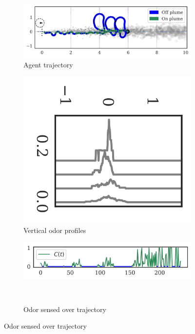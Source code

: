 \documentclass[5p,twocolumn,authoryear]{elsarticle}
\begin{document}
\begin{figure}[h!]
\centering
\begin{subfigure}{0.44\textwidth}
    \includegraphics[width=\textwidth]{output_16_1}
    \caption{Agent trajectory}
\end{subfigure}%
\vspace{0.00mm} 
\begin{subfigure}{0.14\textwidth}
    \includegraphics[width=\textwidth,angle=90,origin=c]{output_16_3.png}
    \caption{Vertical odor profiles}
\end{subfigure}%
\begin{subfigure}{0.40\textwidth}
    \includegraphics[width=\textwidth]{output_16_6.png} 
    \caption{Odor sensed over trajectory} \\

\end{subfigure}
\end{figure}
\end{document}

